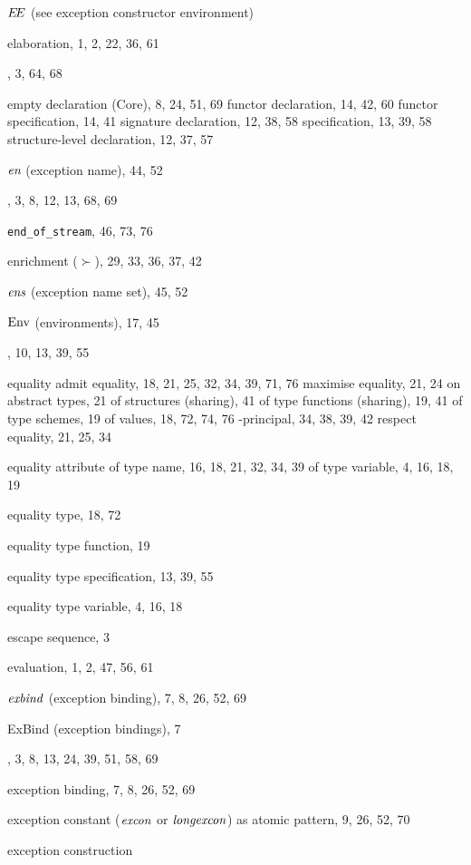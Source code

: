 \begin{theindex}
\item $\mbox{$E\!E$}$ (see exception constructor environment) 
\item elaboration, 1, 2, 22, 36, 61
\item \ELSE, 3, 64, 68
\item empty 
\subitem declaration (Core), 8, 24, 51, 69
\subitem functor declaration, 14, 42, 60
\subitem functor specification, 14, 41
\subitem signature declaration, 12, 38, 58
\subitem specification, 13, 39, 58
\subitem structure-level declaration, 12, 37, 57
\item $\mbox{\it en}$ (exception name), 44, 52
\item \END, 3, 8, 12, 13, 68, 69
\item \verb+end_of_stream+, 46, 73, 76
\item enrichment ($\succ$), 29, 33, 36, 37, 42
\item $\mbox{\it ens}$ (exception name set), 45, 52
\item ${\rm Env}$ (environments), 17, 45
\item \EQTYPE, 10, 13, 39, 55
\item equality 
\subitem admit equality, 18, 21, 25, 32, 34, 39, 71, 76
\subitem maximise equality, 21, 24
\subitem on abstract types, 21
\subitem of structures (sharing), 41
\subitem of type functions (sharing), 19, 41
\subitem of type schemes, 19
\subitem of values, 18, 72, 74, 76
\subitem -principal, 34, 38, 39, 42
\subitem respect equality, 21, 25, 34
\item equality attribute 
\subitem of type name, 16, 18, 21, 32, 34, 39
\subitem of type variable, 4, 16, 18, 19
\item equality type, 18, 72
\item equality type function, 19
\item equality type specification, 13, 39, 55
\item equality type variable, 4, 16, 18
\item escape sequence, 3
\item evaluation, 1, 2, 47, 56, 61
\item ${\it exbind}$ (exception binding), 7, 8, 26, 52, 69
\item ExBind (exception bindings), 7
\item \EXCEPTION, 3, 8, 13, 24, 39, 51, 58, 69
\item exception binding, 7, 8, 26, 52, 69
\item exception constant (${\it excon}$ or ${\it longexcon}$) 
\subitem as atomic pattern, 9, 26, 52, 70
\item exception construction 

\end{theindex}
